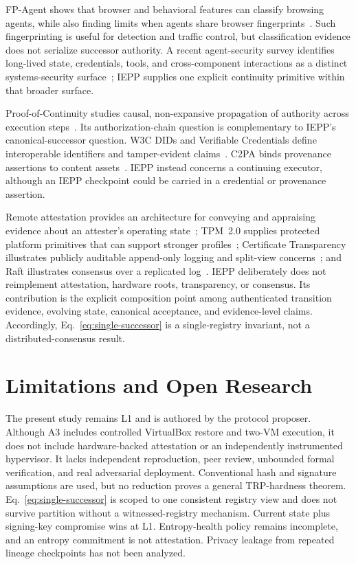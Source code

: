 \documentclass[11pt]{article}
\newcommand{\iepp}{\textsc{IEPP}}
\begin{document}
FP-Agent shows that browser and behavioral features can classify browsing agents, while also finding limits when agents share browser fingerprints~\cite{wang2026fpagent}. Such fingerprinting is useful for detection and traffic control, but classification evidence does not serialize successor authority. A recent agent-security survey identifies long-lived state, credentials, tools, and cross-component interactions as a distinct systems-security surface~\cite{kim2026landscape}; \iepp{} supplies one explicit continuity primitive within that broader surface.

Proof-of-Continuity studies causal, non-expansive propagation of authority across execution steps~\cite{gallo2026continuity}. Its authorization-chain question is complementary to \iepp{}'s canonical-successor question. W3C DIDs and Verifiable Credentials define interoperable identifiers and tamper-evident claims~\cite{w3cdid,w3cvc}. C2PA binds provenance assertions to content assets~\cite{c2pa}. \iepp{} instead concerns a continuing executor, although an IEPP checkpoint could be carried in a credential or provenance assertion.

Remote attestation provides an architecture for conveying and appraising evidence about an attester's operating state~\cite{rfc9334}; TPM~2.0 supplies protected platform primitives that can support stronger profiles~\cite{tcgtpm}; Certificate Transparency illustrates publicly auditable append-only logging and split-view concerns~\cite{rfc9162}; and Raft illustrates consensus over a replicated log~\cite{ongaro2014raft}. \iepp{} deliberately does not reimplement attestation, hardware roots, transparency, or consensus. Its contribution is the explicit composition point among authenticated transition evidence, evolving state, canonical acceptance, and evidence-level claims. Accordingly, Eq.~\ref{eq:single-successor} is a single-registry invariant, not a distributed-consensus result.

\section{Limitations and Open Research}
The present study remains L1 and is authored by the protocol proposer. Although A3 includes controlled VirtualBox restore and two-VM execution, it does not include hardware-backed attestation or an independently instrumented hypervisor. It lacks independent reproduction, peer review, unbounded formal verification, and real adversarial deployment. Conventional hash and signature assumptions are used, but no reduction proves a general TRP-hardness theorem. Eq.~\ref{eq:single-successor} is scoped to one consistent registry view and does not survive partition without a witnessed-registry mechanism. Current state plus signing-key compromise wins at L1. Entropy-health policy remains incomplete, and an entropy commitment is not attestation. Privacy leakage from repeated lineage checkpoints has not been analyzed.
\end{document}
